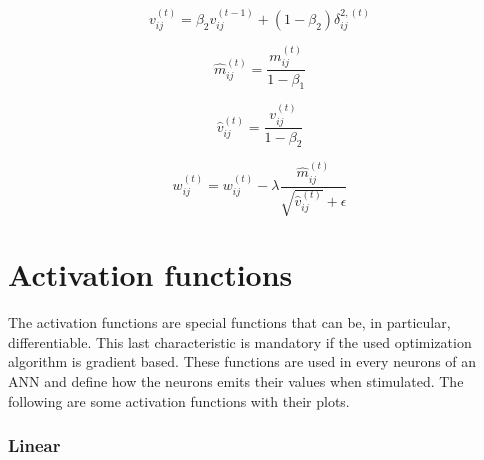\begin{center}
	\begin{equation}
		v_{ij}^{(t)} = \beta_2v_{ij}^{(t-1)} + (1 - \beta_2)\delta_{ij}^{2,  (t)}
	\end{equation}
\end{center}

\begin{center}
	\begin{equation}
		\hat{m}_{ij}^{(t)} = \frac{m_{ij}^{(t)}}{1 - \beta_{1}}
	\end{equation}
\end{center}

\begin{center}
	\begin{equation}
		\hat{v}_{ij}^{(t)} = \frac{v_{ij}^{(t)}}{1 - \beta_{2}}
	\end{equation}
\end{center}

\begin{center}
	\begin{equation}
		w_{ij}^{(t)} = w_{ij}^{(t)} - \lambda\frac{\hat{m}_{ij}^{(t)}}{\sqrt{\hat{v}_{ij}^{(t)}} + \epsilon}
	\end{equation}
\end{center}


\section{Activation functions}
The activation functions are special functions that can be, in particular, differentiable. This last characteristic is mandatory if the used optimization algorithm is gradient based. These functions are used in every neurons of an ANN and define how the neurons emits their values when stimulated. The following are some activation functions with their plots.

\subsubsection*{Linear}

